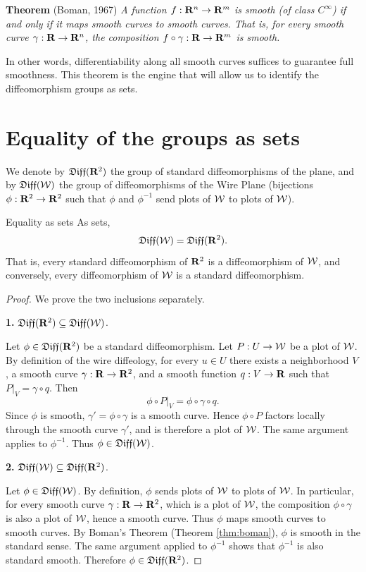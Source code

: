 \textbf{Theorem} (Boman, 1967)
\label{thm:boman}
{\it A function $f: \mathbf{R}^n \to \mathbf{R}^m$ is smooth (of class $C^\infty$) if and only if it maps smooth curves to smooth curves.
That is,
for every smooth curve $\gamma: \mathbf{R} \to \mathbf{R}^n$,
the composition $f \circ \gamma: \mathbf{R} \to \mathbf{R}^m$ is smooth.
}

In other words,
differentiability along all smooth curves suffices to guarantee full smoothness.
This theorem is the engine that will allow us to identify the diffeomorphism groups as sets.

\section{Equality of the groups as sets}

We denote by $\mathfrak{Diff}(\mathbf{R}^2)$ the group of standard diffeomorphisms of the plane,
and by $\mathfrak{Diff}(\mathcal{W})$ the group of diffeomorphisms of the Wire Plane
(bijections $\phi: \mathbf{R}^2 \to \mathbf{R}^2$ such that $\phi$ and $\phi^{-1}$ send plots of $\mathcal{W}$ to plots of $\mathcal{W}$).

\begin{Article}{Equality as sets}{}
  \label{prop:group-equality}
  As sets,
  $$%
    \Diff(\cW) = \Diff(\RR^2).
    $$%
  That is,
  every standard diffeomorphism of $\mathbf{R}^2$ is a diffeomorphism of $\mathcal{W}$,
  and conversely,
  every diffeomorphism of $\mathcal{W}$ is a standard diffeomorphism.
\end{Article}

\begin{proof}
  We prove the two inclusions separately.
  
  \textbf{1.} $\mathfrak{Diff}(\mathbf{R}^2) \subseteq \mathfrak{Diff}(\mathcal{W})$.
  
  Let $\phi \in \mathfrak{Diff}(\mathbf{R}^2)$ be a standard diffeomorphism.
  Let $P: U \to \mathcal{W}$ be a plot of $\mathcal{W}$.
  By definition of the wire diffeology,
  for every $u \in U$ there exists a neighborhood $V$,
  a smooth curve $\gamma: \mathbf{R} \to \mathbf{R}^2$,
  and a smooth function $q: V \to \mathbf{R}$ such that $P|_V = \gamma \circ q$.
  Then
  $$%
    \phi \circ P|_V = \phi \circ \gamma \circ q.
    $$%
  Since $\phi$ is smooth,
  $\gamma' = \phi \circ \gamma$ is a smooth curve.
  Hence $\phi \circ P$ factors locally through the smooth curve $\gamma'$,
  and is therefore a plot of $\mathcal{W}$.
  The same argument applies to $\phi^{-1}$.
  Thus $\phi \in \mathfrak{Diff}(\mathcal{W})$.
  
  \textbf{2.} $\mathfrak{Diff}(\mathcal{W}) \subseteq \mathfrak{Diff}(\mathbf{R}^2)$.
  
  Let $\phi \in \mathfrak{Diff}(\mathcal{W})$.
  By definition,
  $\phi$ sends plots of $\mathcal{W}$ to plots of $\mathcal{W}$.
  In particular,
  for every smooth curve $\gamma: \mathbf{R} \to \mathbf{R}^2$,
  which is a plot of $\mathcal{W}$,
  the composition $\phi \circ \gamma$ is also a plot of $\mathcal{W}$,
  hence a smooth curve.
  Thus $\phi$ maps smooth curves to smooth curves.
  By Boman's Theorem (Theorem \ref{thm:boman}),
  $\phi$ is smooth in the standard sense.
  The same argument applied to $\phi^{-1}$ shows that $\phi^{-1}$ is also standard smooth.
  Therefore $\phi \in \mathfrak{Diff}(\mathbf{R}^2)$.
\end{proof}


